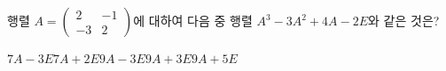 \hspace*{2mm}\begin{minipage}[t]{\dimexpr\linewidth-2mm\relax}\vspace{0pt}
행렬 $A=\begin{pmatrix} 2 & -1 \\ -3 & 2 \end{pmatrix}$에 대하여 다음 중 행렬 $A^3-3A^2+4A-2E$와 같은 것은?
\begin{choices32}{$7A-3E$}{$7A+2E$}{$9A-3E$}{$9A+3E$}{$9A+5E$}\end{choices32}\end{minipage}

